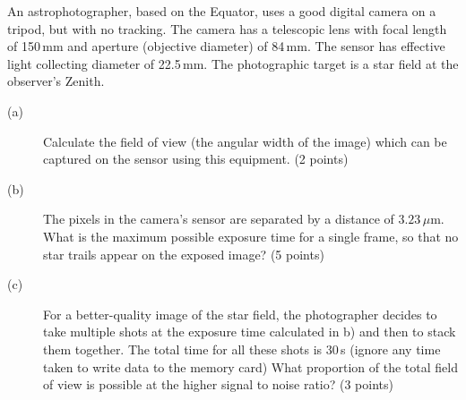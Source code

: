 An astrophotographer, based on the Equator, uses a good digital camera on a
tripod, but with no tracking. The camera has a telescopic lens with focal
length of 150\,mm and aperture (objective diameter) of 84\,mm. The sensor has
effective light collecting diameter of 22.5\,mm. The photographic target is a
star field at the observer's Zenith.

\begin{description}
\item[(a)] Calculate the field of view (the angular width of the image) which
  can be captured on the sensor using this equipment. \hfill(2 points)
\item[(b)] The pixels in the camera's sensor are separated by a distance of
  $3.23\,\mu$m. What is the maximum possible exposure time for a single
  frame, so that no star trails appear on the exposed image?
  \hfill(5 points)
\item[(c)] For a better-quality image of the star field, the photographer
  decides to take multiple shots at the exposure time calculated in b) and
  then to stack them together. The total time for all these shots is 30\,s
  (ignore any time taken to write data to the memory card) What proportion of
  the total field of view is possible at the higher signal to noise ratio?
  \hfill(3 points)
\end{description}
